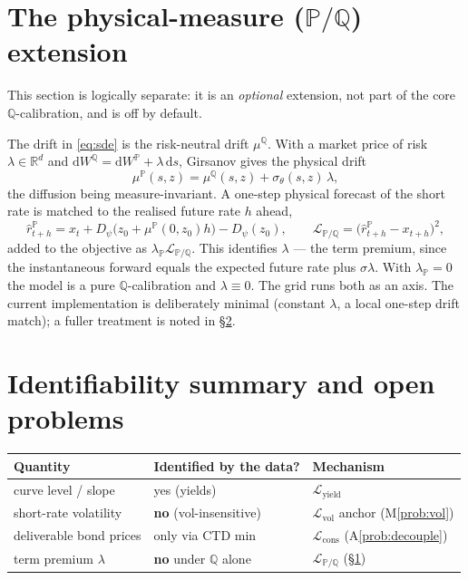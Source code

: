 \documentclass[11pt]{article}
\newcommand{\QQ}{\mathbb{Q}}
\newcommand{\PP}{\mathbb{P}}
\newcommand{\R}{\mathbb{R}}
\newcommand{\dd}{\mathrm{d}}
\begin{document}
\section{The physical-measure ($\PP/\QQ$) extension}\label{sec:pq}
This section is logically separate: it is an \emph{optional} extension, not
part of the core $\QQ$-calibration, and is off by default.

The drift in \eqref{eq:sde} is the risk-neutral drift $\mu^{\QQ}$. With a
market price of risk $\lambda\in\R^d$ and
$\dd W^{\QQ}=\dd W^{\PP}+\lambda\,\dd s$, Girsanov gives the physical drift
\begin{equation}
\mu^{\PP}(s,z)=\mu^{\QQ}(s,z)+\sigma_\theta(s,z)\,\lambda,
\end{equation}
the diffusion being measure-invariant. A one-step physical forecast of the
short rate is matched to the realised future rate $h$ ahead,
\begin{equation}
\hat r^{\PP}_{t+h}=x_t+D_\psi\big(z_0+\mu^{\PP}(0,z_0)h\big)-D_\psi(z_0),
\qquad
\mathcal L_{\PP/\QQ}=\big(\hat r^{\PP}_{t+h}-x_{t+h}\big)^2,
\end{equation}
added to the objective as $\lambda_{\PP}\mathcal L_{\PP/\QQ}$. This identifies
$\lambda$ --- the term premium, since the instantaneous forward equals the
expected future rate plus $\sigma\lambda$. With $\lambda_{\PP}=0$ the model is a
pure $\QQ$-calibration and $\lambda\equiv0$. The grid runs both as an axis. The
current implementation is deliberately minimal (constant $\lambda$, a local
one-step drift match); a fuller treatment is noted in \S\ref{sec:future}.

\section{Identifiability summary and open problems}\label{sec:future}
\begin{center}
\begin{tabular}{@{}lll@{}}
\toprule
Quantity & Identified by the data? & Mechanism \\
\midrule
curve level / slope & yes (yields) & $\mathcal L_{\text{yield}}$ \\
short-rate volatility & \textbf{no} (vol-insensitive) & $\mathcal L_{\text{vol}}$ anchor (M\ref{prob:vol}) \\
deliverable bond prices & only via CTD min & $\mathcal L_{\text{cons}}$ (A\ref{prob:decouple}) \\
term premium $\lambda$ & \textbf{no} under $\QQ$ alone & $\mathcal L_{\PP/\QQ}$ (\S\ref{sec:pq}) \\
\bottomrule
\end{tabular}
\end{center}
\end{document}
